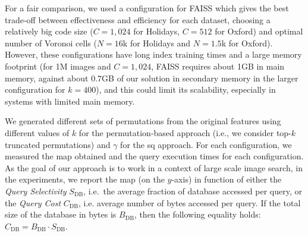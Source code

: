 For a fair comparison, we used a configuration for FAISS which gives the best trade-off between effectiveness and efficiency for each dataset, choosing a relatively big code size ($C=1,024$ for Holidays, $C=512$ for Oxford) and optimal number of Voronoi cells ($N = 16$k for Holidays and $N=1.5$k for Oxford).
However, these configurations have long index training times and a large memory footprint (for 1M images and $C=1,024$, FAISS requires about 1GB in main memory, against about 0.7GB of our solution in secondary memory in the larger configuration for $k=400$), and this could limit its scalability, especially in systems with limited main memory.

We generated different sets of permutations from the original features using different values of $k$ for the permutation-based approach (i.e., we consider top-$k$ truncated permutations) and $\gamma$ for the \gls{sq} approach.
For each configuration, we measured the \acrfull{map} obtained and the query execution times for each configuration.
As the goal of our approach is to work in a context of large scale image search, in the experiments, we report the \gls{map} (on the $y$-axis) in function of either the \emph{Query Selectivity} $S_\text{DB}$, i.e.\ the average fraction of database accessed per query, or the \emph{Query Cost} $C_\text{DB}$, i.e. average number of bytes accessed per query.
If the total size of the database in bytes is $B_\text{DB}$, then the following equality holds: $C_\text{DB} = B_\text{DB} \cdot S_\text{DB}$.


